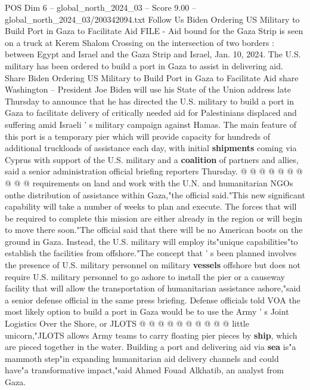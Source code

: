 \begin{textsample}{POS Dim 6 – global\_north\_2024\_03 – Score 9.00 – global\_north\_2024\_03/200342094.txt}  \label{ex:f6_pos_058}
Follow Us Biden Ordering US Military to Build Port in Gaza to Facilitate Aid FILE - Aid bound for the Gaza Strip is seen on a truck at Kerem Shalom Crossing on the intersection of two borders : between Egypt and Israel and the Gaza Strip and Israel, Jan. 10, 2024.
The U.S. military has been ordered to build a port in Gaza to assist in delivering aid.
Share Biden Ordering US Military to Build Port in Gaza to Facilitate Aid share Washington -- President Joe Biden will use his State of the Union address late Thursday to announce that he has directed the U.S. military to build a port in Gaza to facilitate delivery of critically needed aid for Palestinians displaced and suffering amid Israeli ' s military campaign against Hamas.
The main feature of this port is a temporary pier which will provide capacity for hundreds of additional truckloads of assistance each day, with initial \textbf{shipments} coming via Cyprus with support of the U.S. military and a \textbf{coalition} of partners and allies, said a senior administration official briefing reporters Thursday. @ @ @ @ @ @ @ @ @ @ requirements on land and work with the U.N. and humanitarian NGOs onthe distribution of assistance within Gaza,"the official said."This new significant capability will take a number of weeks to plan and execute.
The forces that will be required to complete this mission are either already in the region or will begin to move there soon."The official said that there will be no American boots on the ground in Gaza.
Instead, the U.S. military will employ its"unique capabilities"to establish the facilities from offshore."The concept that ' s been planned involves the presence of U.S. military personnel on military \textbf{vessels} offshore but does not require U.S. military personnel to go ashore to install the pier or a causeway facility that will allow the transportation of humanitarian assistance ashore,"said a senior defense official in the same press briefing.
Defense officials told VOA the most likely option to build a port in Gaza would be to use the Army ' s Joint Logistics Over the Shore, or JLOTS @ @ @ @ @ @ @ @ @ @ little unicorn,"JLOTS allows Army teams to carry floating pier pieces by \textbf{ship}, which are pieced together in the water.
Building a port and delivering aid via \textbf{sea} is"a mammoth step"in expanding humanitarian aid delivery channels and could have"a transformative impact,"said Ahmed Fouad Alkhatib, an analyst from Gaza.

\end{textsample}
